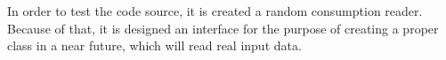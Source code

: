 
In order to test the code source, it is created a random consumption reader. Because of that, it is designed an interface for the purpose of creating a proper class in a near future, which will read real input data.
